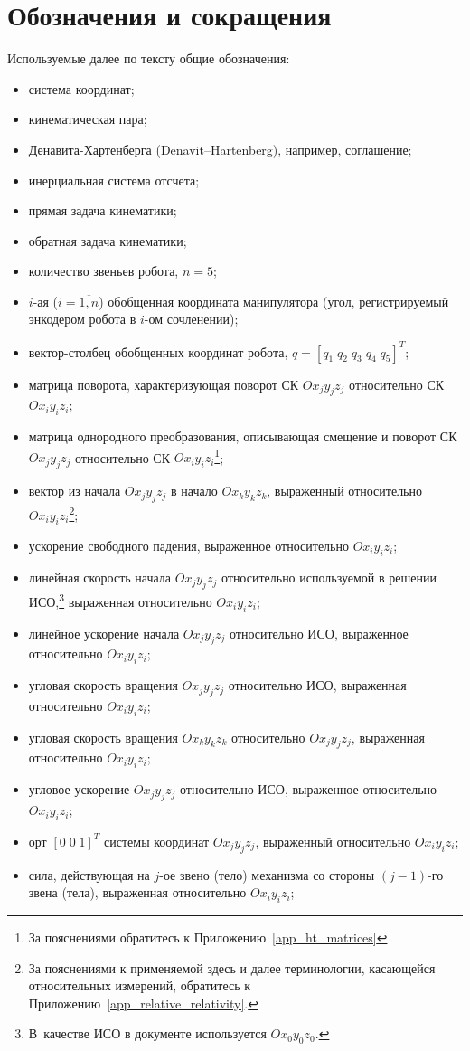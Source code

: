\section*{Обозначения и сокращения}
Используемые далее по тексту общие обозначения:
\newcommand*{\ditem}[1]{\item[#1~---]}
\begin{itemize}
\ditem{СК} система координат;
\ditem{КП} кинематическая пара;
\ditem{ДХ} Денавита-Хартенберга (Denavit–Hartenberg), например, соглашение;
\ditem{ИСО} инерциальная система отсчета;
\ditem{ПЗК} прямая задача кинематики;
\ditem{ОЗК} обратная задача кинематики;
\ditem{$n$} количество звеньев робота, $n = 5$;
\ditem{$q_i$} $i$-ая ($i=\overline{1,n}$) обобщенная координата манипулятора (угол, регистрируемый энкодером робота в $i$-ом сочленении);
\ditem{$q$} вектор-столбец обобщенных координат робота, $q = \left[ q_1 \; q_2 \; q_3 \; q_4 \; q_5 \right]^T$;
\ditem{${}^iR_j$} матрица поворота, характеризующая поворот СК $Ox_{j}y_{j}z_{j}$ относительно СК $Ox_{i}y_{i}z_{i}$;
\ditem{${}^iA_j$} матрица однородного преобразования, описывающая смещение и поворот СК $Ox_{j}y_{j}z_{j}$ относительно СК $Ox_{i}y_{i}z_{i}$\footnote{За пояснениями обратитесь к Приложению~\ref{app_ht_matrices}};
\ditem{$r^i_{j,\,k}$} вектор из начала $Ox_{j}y_{j}z_{j}$ в начало $Ox_{k}y_{k}z_{k}$, выраженный относительно $Ox_{i}y_{i}z_{i}$\footnote{За пояснениями к применяемой здесь и далее терминологии, касающейся относительных измерений, обратитесь к Приложению~\ref{app_relative_relativity}.};
\ditem{$g_i$} ускорение свободного падения, выраженное относительно $Ox_{i}y_{i}z_{i}$;
\ditem{$v^i_j$} линейная скорость начала $Ox_{j}y_{j}z_{j}$ относительно используемой в решении ИСО\lefteqn,\footnote{В~качестве ИСО в документе используется $Ox_0y_0z_0$.} выраженная относительно $Ox_{i}y_{i}z_{i}$;
\ditem{$a^i_j$} линейное ускорение начала $Ox_{j}y_{j}z_{j}$ относительно ИСО, выраженное относительно $Ox_{i}y_{i}z_{i}$;
\ditem{$\omega^i_j$} угловая скорость вращения $Ox_{j}y_{j}z_{j}$ относительно ИСО, выраженная относительно $Ox_{i}y_{i}z_{i}$;
\ditem{$\omega^i_{j,\,k}$} угловая скорость вращения $Ox_{k}y_{k}z_{k}$ относительно $Ox_{j}y_{j}z_{j}$, выраженная относительно $Ox_{i}y_{i}z_{i}$;
\ditem{$\dot\omega^i_j$} угловое ускорение $Ox_{j}y_{j}z_{j}$ относительно ИСО, выраженное относительно $Ox_{i}y_{i}z_{i}$;
\ditem{$z^i_j$} орт $[0\;0\;1]^T$ системы координат $Ox_{j}y_{j}z_{j}$, выраженный относительно $Ox_{i}y_{i}z_{i}$;
\ditem{$f^i_j$} сила, действующая на $j$-ое звено (тело) механизма со стороны $(j-1)$-го звена (тела), выраженная относительно $Ox_{i}y_{i}z_{i}$;

\end{itemize}
